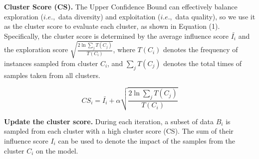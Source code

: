 \documentclass{article} %
\begin{document}



\textbf{Cluster Score (CS).} The Upper Confidence Bound can effectively balance exploration ($i.e.,$ data diversity) and exploitation ($i.e.,$ data quality), so we use it as the cluster score to evaluate each cluster, as shown in Equation (1). 
%
Specifically, the cluster score is determined by the average influence score $\bar{I_i}$ and the exploration score $\sqrt{\frac{2\ln {\sum_j{T(C_j)}}}{T(C_i)}}$, where $T(C_i)$ denotes the frequency of instances sampled from cluster $C_i$, and $\sum_j T(C_j)$ denotes  the total times of samples taken from all clusters.

\begin{equation}
    CS_{i}=\bar{I_i}+\alpha\sqrt{\frac{2\ln {\sum_j{T(C_j)}}}{T(C_i)}}
\end{equation}

\textbf{Update the cluster score.} During each iteration, a subset of data $B_i$ is sampled from each cluster with a high cluster score (CS). 
The sum of their influence score $I_i$ can be used to denote the impact of the samples from the cluster $C_i$ on the model.
\end{document}
